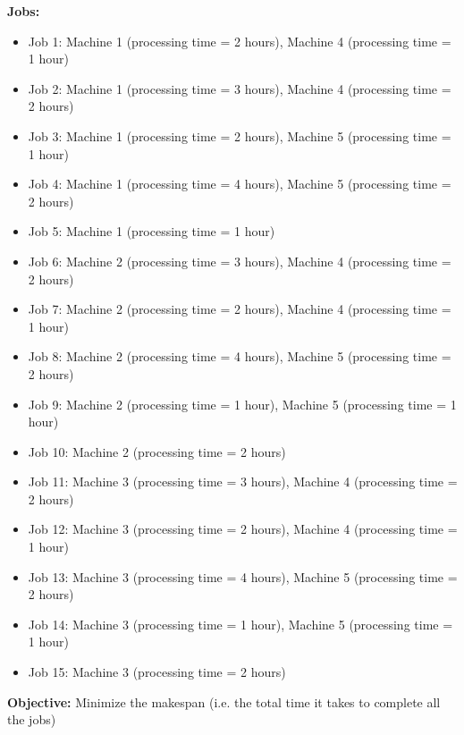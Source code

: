 \textbf{Jobs:}
\begin{itemize}
    \item Job 1: Machine 1 (processing time = 2 hours), Machine 4 (processing time = 1 hour)
    \item Job 2: Machine 1 (processing time = 3 hours), Machine 4 (processing time = 2 hours)
    \item Job 3: Machine 1 (processing time = 2 hours), Machine 5 (processing time = 1 hour)
    \item Job 4: Machine 1 (processing time = 4 hours), Machine 5 (processing time = 2 hours)
    \item Job 5: Machine 1 (processing time = 1 hour)
    \item Job 6: Machine 2 (processing time = 3 hours), Machine 4 (processing time = 2 hours)
    \item Job 7: Machine 2 (processing time = 2 hours), Machine 4 (processing time = 1 hour)
    \item Job 8: Machine 2 (processing time = 4 hours), Machine 5 (processing time = 2 hours)
    \item Job 9: Machine 2 (processing time = 1 hour), Machine 5 (processing time = 1 hour)
    \item Job 10: Machine 2 (processing time = 2 hours)
    \item Job 11: Machine 3 (processing time = 3 hours), Machine 4 (processing time = 2 hours)
    \item Job 12: Machine 3 (processing time = 2 hours), Machine 4 (processing time = 1 hour)
    \item Job 13: Machine 3 (processing time = 4 hours), Machine 5 (processing time = 2 hours)
    \item Job 14: Machine 3 (processing time = 1 hour), Machine 5 (processing time = 1 hour)
    \item Job 15: Machine 3 (processing time = 2 hours)
\end{itemize}

\textbf{Objective:} Minimize the makespan (i.e. the total time it takes to complete all the jobs)

